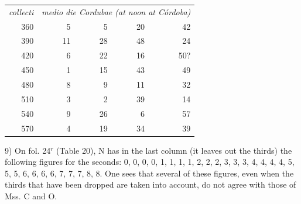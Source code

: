 \documentclass[11pt]{article}
\begin{document}
\begin{center}\small\begin{tabular}{rrrrr}
\emph{collecti} & \multicolumn{4}{c}{\emph{medio die Cordubae (at noon at Córdoba)}} \\
360 & 5 & 5 & 20 & 42 \\
390 & 11 & 28 & 48 & 24 \\
420 & 6 & 22 & 16 & 50? \\
450 & 1 & 15 & 43 & 49 \\
480 & 8 & 9 & 11 & 32 \\
510 & 3 & 2 & 39 & 14 \\
540 & 9 & 26 & 6 & 57 \\
570 & 4 & 19 & 34 & 39 \\
\end{tabular}\end{center}
\par 9) On fol. 24$^{r}$ (Table 20), N has in the last column (it leaves out the thirds) the following figures for the seconds: 0, 0, 0, 0, 1, 1, 1, 1, 2, 2, 2, 3, 3, 3, 4, 4, 4, 4, 5, 5, 5, 6, 6, 6, 6, 7, 7, 7, 8, 8. One sees that several of these figures, even when the thirds that have been dropped are taken into account, do not agree with those of Mss. C and O.\par
\end{document}
